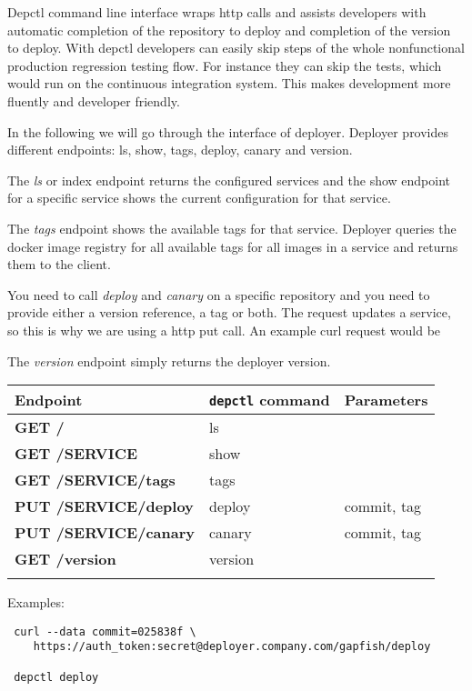 Depctl command line interface wraps http calls and assists developers with automatic
completion of the repository to deploy and completion of the version to deploy. With
depctl developers can easily skip steps of the whole nonfunctional production regression
testing flow. For instance they can skip the tests, which would run on the continuous
integration system. This makes development more fluently and developer friendly.

In the following we will go through the interface of deployer. Deployer provides different
endpoints: ls, show, tags, deploy, canary and version.

The \emph{ls} or index endpoint returns the configured services and the show endpoint for a
specific service shows the current configuration for that service.

The \emph{tags} endpoint shows
the available tags for that service. Deployer queries the docker image registry for all
available tags for all images in a service and returns them to the client.

You need to call \emph{deploy} and \emph{canary} on a specific repository and you
need to provide either a version reference, a tag or both. The request updates a service, so
this is why we are using a http put call. An example curl request would be

The \emph{version}
endpoint simply returns the deployer version.

\begin{table}[!htbp]
  \begin{tabular}{ l|l|l }
    Endpoint & \texttt{depctl} command & Parameters \\
    \hline \hline
    \textbf{GET /} & ls & \\
    \textbf{GET /SERVICE} & show & \\
    \textbf{GET /SERVICE/tags} & tags & \\
    \textbf{PUT /SERVICE/deploy} & deploy & commit, tag \\
    \textbf{PUT /SERVICE/canary} & canary & commit, tag \\
    \textbf{GET /version} & version & \\
    \multicolumn{3}{l}{} %
  \end{tabular}

  Examples:

\begin{verbatim}
 curl --data commit=025838f \
    https://auth_token:secret@deployer.company.com/gapfish/deploy

 depctl deploy
\end{verbatim}
\end{table}

